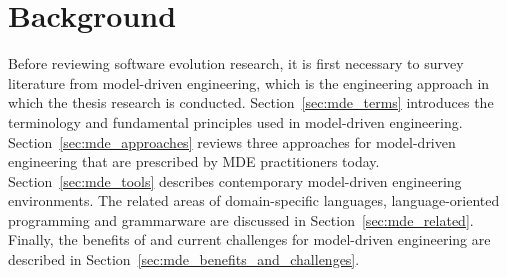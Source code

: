 
\chapter{Background}
\label{Background}

Before reviewing software evolution research, it is first necessary to survey literature from model-driven engineering, which is the engineering approach in which the thesis research is conducted. Section~\ref{sec:mde_terms} introduces the terminology and fundamental principles used in model-driven engineering. Section~\ref{sec:mde_approaches} reviews three approaches for model-driven engineering that are prescribed by MDE practitioners today. Section~\ref{sec:mde_tools} describes contemporary model-driven engineering environments. The related areas of domain-specific languages, language-oriented programming and grammarware are discussed in Section~\ref{sec:mde_related}. Finally, the benefits of and current challenges for model-driven engineering are described in Section~\ref{sec:mde_benefits_and_challenges}.





